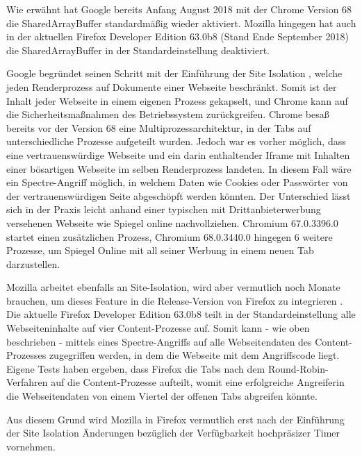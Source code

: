 Wie erwähnt hat Google bereits Anfang August 2018 mit der Chrome Version 68 \cite{ChromeSharedArrayBufferAgain} die SharedArrayBuffer standardmäßig wieder aktiviert.
Mozilla hingegen hat auch in der aktuellen Firefox Developer Edition 63.0b8 (Stand Ende September 2018) die SharedArrayBuffer in der Standardeinstellung deaktiviert.

Google begründet seinen Schritt mit der Einführung der Site Isolation \cite{ChromeSiteIsolation}, welche jeden Renderprozess auf Dokumente einer Webseite beschränkt. Somit ist der Inhalt jeder Webseite in einem eigenen Prozess gekapselt, und Chrome kann auf die Sicherheitsmaßnahmen des Betriebssystem zurückgreifen.
Chrome besaß bereits vor der Version 68 eine Multiprozessarchitektur, in der Tabs auf unterschiedliche Prozesse aufgeteilt wurden.
Jedoch war es vorher möglich, dass eine vertrauenswürdige Webseite und ein darin enthaltender Iframe mit Inhalten einer bösartigen Webseite im selben Renderprozess landeten.
In diesem Fall wäre ein Spectre-Angriff möglich, in welchem Daten wie Cookies oder Passwörter von der vertrauenswürdigen Seite abgeschöpft werden könnten.
Der Unterschied lässt sich in der Praxis leicht anhand einer typischen mit Drittanbieterwerbung versehenen Webseite wie Spiegel online nachvollziehen.
Chromium 67.0.3396.0 startet einen zusätzlichen Prozess, Chromium 68.0.3440.0 hingegen 6 weitere Prozesse, um Spiegel Online mit all seiner Werbung in einem neuen Tab darzustellen.


Mozilla arbeitet ebenfalls an Site-Isolation, wird aber vermutlich noch Monate brauchen, um dieses Feature in die Release-Version von Firefox zu integrieren \cite{FirefoxSiteIsolation}.
Die aktuelle Firefox Developer Edition 63.0b8 teilt in der Standardeinstellung alle Webseiteninhalte auf vier Content-Prozesse auf. 
Somit kann - wie oben beschrieben - mittels eines Spectre-Angriffs auf alle Webseitendaten des Content-Prozesses zugegriffen werden, in dem die Webseite mit dem Angriffscode liegt.
Eigene Tests %
haben ergeben, dass Firefox die Tabs nach dem Round-Robin-Verfahren auf die Content-Prozesse aufteilt, womit eine erfolgreiche Angreiferin die Webseitendaten von einem Viertel der offenen Tabs abgreifen könnte.

Aus diesem Grund wird Mozilla in Firefox vermutlich erst nach der Einführung der Site Isolation Änderungen bezüglich der Verfügbarkeit hochpräsizer Timer vornehmen.

